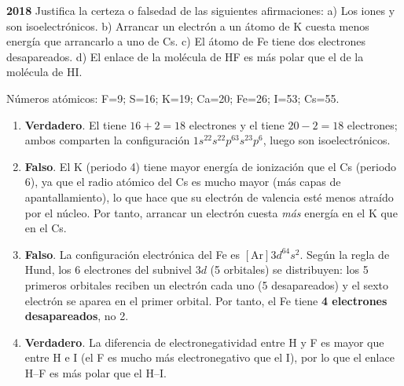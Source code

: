 \begin{exerciseEVAU}
    \textbf{ 2018 } Justifica la certeza o falsedad de las siguientes afirmaciones: a) Los iones  y  son isoelectrónicos. b) Arrancar un electrón a un átomo de K cuesta menos energía que arrancarlo a uno de Cs. c) El átomo de Fe tiene dos electrones desapareados. d) El enlace de la molécula de HF es más polar que el de la molécula de HI.

    \datos{} Números atómicos: F=9; S=16; K=19; Ca=20; Fe=26; I=53; Cs=55.

    \begin{solu}


        \begin{enumerate}[label=\letraminuscula]
            \item \textbf{Verdadero}. El  tiene \(16+2=18\) electrones y el  tiene \(20-2=18\) electrones; ambos comparten la configuración \( 1s^22s^22p^63s^23p^6 \), luego son isoelectrónicos.

            \item \textbf{Falso}. El K (periodo 4) tiene mayor energía de ionización que el Cs (periodo 6), ya que el radio atómico del Cs es mucho mayor (más capas de apantallamiento), lo que hace que su electrón de valencia esté menos atraído por el núcleo. Por tanto, arrancar un electrón cuesta \emph{más} energía en el K que en el Cs.

            \item \textbf{Falso}. La configuración electrónica del Fe es \([\text{Ar}]3d^64s^2\). Según la regla de Hund, los 6 electrones del subnivel \(3d\) (5 orbitales) se distribuyen: los 5 primeros orbitales reciben un electrón cada uno (5 desapareados) y el sexto electrón se aparea en el primer orbital. Por tanto, el Fe tiene \textbf{4 electrones desapareados}, no 2.

            \item \textbf{Verdadero}. La diferencia de electronegatividad entre H y F es mayor que entre H e I (el F es mucho más electronegativo que el I), por lo que el enlace H--F es más polar que el H--I.
        \end{enumerate}
    \end{solu}
\end{exerciseEVAU}
